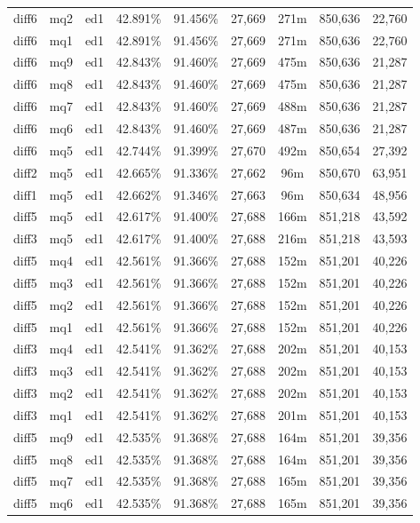 \begin{landscape}
\begin{longtable}{|c|c|c||c|c||c|c|c|c|}
diff6 & mq2 & ed1 & 42.891\% & 91.456\% & 27,669 & 271m & 850,636 & 22,760 \\
diff6 & mq1 & ed1 & 42.891\% & 91.456\% & 27,669 & 271m & 850,636 & 22,760 \\
diff6 & mq9 & ed1 & 42.843\% & 91.460\% & 27,669 & 475m & 850,636 & 21,287 \\
diff6 & mq8 & ed1 & 42.843\% & 91.460\% & 27,669 & 475m & 850,636 & 21,287 \\
diff6 & mq7 & ed1 & 42.843\% & 91.460\% & 27,669 & 488m & 850,636 & 21,287 \\
diff6 & mq6 & ed1 & 42.843\% & 91.460\% & 27,669 & 487m & 850,636 & 21,287 \\
diff6 & mq5 & ed1 & 42.744\% & 91.399\% & 27,670 & 492m & 850,654 & 27,392 \\
diff2 & mq5 & ed1 & 42.665\% & 91.336\% & 27,662 & 96m & 850,670 & 63,951 \\
diff1 & mq5 & ed1 & 42.662\% & 91.346\% & 27,663 & 96m & 850,634 & 48,956 \\
diff5 & mq5 & ed1 & 42.617\% & 91.400\% & 27,688 & 166m & 851,218 & 43,592 \\
diff3 & mq5 & ed1 & 42.617\% & 91.400\% & 27,688 & 216m & 851,218 & 43,593 \\
diff5 & mq4 & ed1 & 42.561\% & 91.366\% & 27,688 & 152m & 851,201 & 40,226 \\
diff5 & mq3 & ed1 & 42.561\% & 91.366\% & 27,688 & 152m & 851,201 & 40,226 \\
diff5 & mq2 & ed1 & 42.561\% & 91.366\% & 27,688 & 152m & 851,201 & 40,226 \\
diff5 & mq1 & ed1 & 42.561\% & 91.366\% & 27,688 & 152m & 851,201 & 40,226 \\
diff3 & mq4 & ed1 & 42.541\% & 91.362\% & 27,688 & 202m & 851,201 & 40,153 \\
diff3 & mq3 & ed1 & 42.541\% & 91.362\% & 27,688 & 202m & 851,201 & 40,153 \\
diff3 & mq2 & ed1 & 42.541\% & 91.362\% & 27,688 & 202m & 851,201 & 40,153 \\
diff3 & mq1 & ed1 & 42.541\% & 91.362\% & 27,688 & 201m & 851,201 & 40,153 \\
diff5 & mq9 & ed1 & 42.535\% & 91.368\% & 27,688 & 164m & 851,201 & 39,356 \\
diff5 & mq8 & ed1 & 42.535\% & 91.368\% & 27,688 & 164m & 851,201 & 39,356 \\
diff5 & mq7 & ed1 & 42.535\% & 91.368\% & 27,688 & 165m & 851,201 & 39,356 \\
diff5 & mq6 & ed1 & 42.535\% & 91.368\% & 27,688 & 165m & 851,201 & 39,356 \\

\end{longtable}
\end{landscape}
